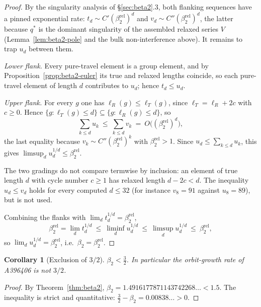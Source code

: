\documentclass[11pt]{article}
\theoremstyle{plain}
\newtheorem{corollary}[theorem]{Corollary}
\theoremstyle{definition}
\theoremstyle{remark}
\begin{document}
\begin{proof}
By the singularity analysis of \S\ref{sec:beta2}.3, both flanking sequences
have a pinned exponential rate: $t_d\sim C'(\beta_2^{\mathrm{rel}})^{d}$ and
$v_d\sim C''(\beta_2^{\mathrm{rel}})^{d}$, the latter because $q^\ast$ is the
dominant singularity of the assembled relaxed series $V$
(Lemma~\ref{lem:beta2-pole} and the bulk non-interference above). It remains to
trap $u_d$ between them.

\emph{Lower flank.} Every pure-travel element is a group element, and by
Proposition~\ref{prop:beta2-euler} its true and relaxed lengths coincide, so
each pure-travel element of length $d$ contributes to $u_d$; hence $t_d\le u_d$.

\emph{Upper flank.} For every $g$ one has $\ell_R(g)\le\ell_T(g)$, since
$\ell_T=\ell_R+2c$ with $c\ge0$. Hence
$\{g:\ell_T(g)\le d\}\subseteq\{g:\ell_R(g)\le d\}$, so
\[
  \sum_{k\le d}u_k\ \le\ \sum_{k\le d}v_k
   \ =\ O\bigl((\beta_2^{\mathrm{rel}})^{d}\bigr),
\]
the last equality because $v_k\sim C''(\beta_2^{\mathrm{rel}})^{k}$ with
$\beta_2^{\mathrm{rel}}>1$. Since $u_d\le\sum_{k\le d}u_k$, this gives
$\limsup_d u_d^{1/d}\le\beta_2^{\mathrm{rel}}$.

The two gradings do not compare termwise by inclusion: an element of true
length $d$ with cycle number $c\ge1$ has relaxed length $d-2c<d$. The
inequality $u_d\le v_d$ holds for every computed $d\le32$ (for instance
$v_8=91$ against $u_8=89$), but is not used.

Combining the flanks with $\lim_d t_d^{1/d}=\beta_2^{\mathrm{rel}}$,
\[
  \beta_2^{\mathrm{rel}}=\lim_d t_d^{1/d}
   \ \le\ \liminf_d u_d^{1/d}
   \ \le\ \limsup_d u_d^{1/d}
   \ \le\ \beta_2^{\mathrm{rel}},
\]
so $\lim_d u_d^{1/d}=\beta_2^{\mathrm{rel}}$, i.e.\
$\beta_2=\beta_2^{\mathrm{rel}}$.
\end{proof}

\begin{corollary}[Exclusion of $3/2$]\label{cor:beta2-no32}
$\beta_2<\tfrac32$. In particular the orbit-growth rate of A396406 is not
$3/2$.
\end{corollary}

\begin{proof}
By Theorem~\ref{thm:beta2}, $\beta_2=1.4916177871143742268\ldots<1.5$. The
inequality is strict and quantitative: $\tfrac32-\beta_2=0.00838\ldots>0$.
\end{proof}
\end{document}
